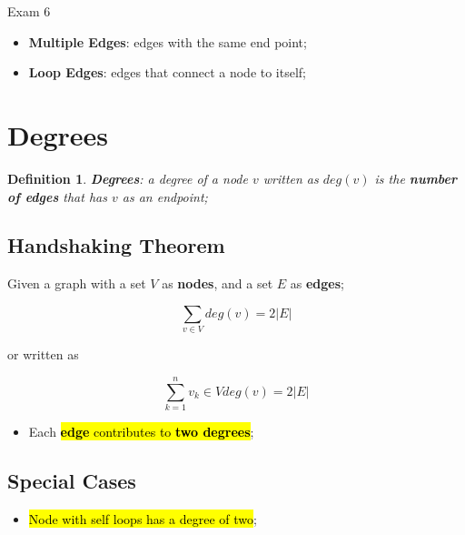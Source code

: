 \documentclass{note}
\newtheorem{definition}{Definition}
\begin{document}
\begin{note}{Exam 6}
        \begin{itemize}
            \item \textbf{Multiple Edges}: edges with the same end point;
            \item \textbf{Loop Edges}: edges that connect a node to itself;
        \end{itemize}

        \section{Degrees}

        \begin{definition}
            \textbf{Degrees}: a degree of a node $ v $ written as $ deg\left( v \right) $ is the \textbf{number of edges} that
            has $ v $ as an endpoint;
        \end{definition}

        \subsection{Handshaking Theorem}

        Given a graph with a set $ V $ as \textbf{nodes}, and a set $ E $ as \textbf{edges};

        \begin{equation}\label{eq: handshaking theorem 1}
            \sum_{v \in V} deg(v) = 2 \left| E \right|
        \end{equation}

        or written as

        \begin{equation}\label{eq: handshaking theorem 2}
            \sum_{k = 1}^{n} v_{k} \in V deg(v) = 2 \left| E \right|
        \end{equation}

        \begin{itemize}
            \item Each \hl{\textbf{edge} contributes to \textbf{two degrees}};
        \end{itemize}

        \subsection{Special Cases}

        \begin{itemize}
            \item \hl{Node with self loops has a degree of two};
        \end{itemize}


\end{note}
\end{document}
